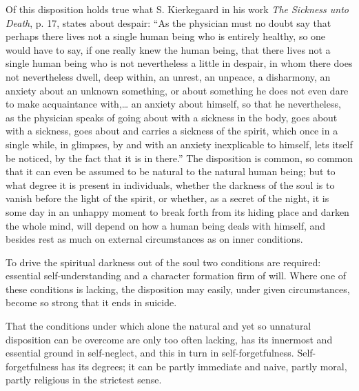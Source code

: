\documentclass[12pt,a4paper,openany]{book}
\newcommand{\opage}[1]{\marginnote{\footnotesize\textit{[#1]}}}
\begin{document}
Of this disposition holds true what S. Kierkegaard in his work \emph{The Sickness unto Death}, p. 17, states about despair: ``As the physician must no doubt say that perhaps there lives not a single human being who is entirely healthy, so one would have to say, if one really knew the human being, that there lives not a single human being who is not nevertheless a little in despair, in whom there does not nevertheless dwell, deep within, an unrest, an unpeace, a disharmony, an anxiety about an unknown something, or about something he does not even dare to make acquaintance with,\dots{} an anxiety about himself, so that he nevertheless, as the physician speaks of going about with a sickness in the body, goes about with a sickness, goes about and carries a sickness of the spirit, which once in a single while, in glimpses, by and with an anxiety inexplicable to himself, lets itself be noticed, by the fact that it is in there.'' The disposition is common, so common that it can even be assumed to be natural to the natural human being; but to what degree it is present in individuals, whether the darkness of the soul is to vanish before the light of the spirit, or whether, as a secret of the night, it is some day in an unhappy moment to break forth from its hiding place and darken the whole mind, will depend on how a human
\setcounter{footnote}{0}%
\opage{700}being deals with himself, and besides rest as much on external circumstances as on inner conditions.

To drive the spiritual darkness out of the soul two conditions are required: essential self-understanding and a character formation firm of will. Where one of these conditions is lacking, the disposition may easily, under given circumstances, become so strong that it ends in suicide.

That the conditions under which alone the natural and yet so unnatural disposition can be overcome are only too often lacking, has its innermost and essential ground in self-neglect, and this in turn in self-forgetfulness. Self-forgetfulness has its degrees; it can be partly immediate and naive, partly moral, partly religious in the strictest sense.
\end{document}
